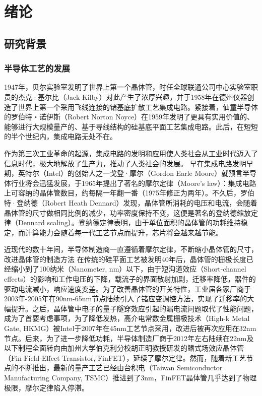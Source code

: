 \chapter{绪论}

\section{研究背景}

\subsection{半导体工艺的发展}

1947年，贝尔实验室发明了世界上第一个晶体管，时任全球联通公司中心实验室职员的杰克·基尔比（Jack Kilby）对此产生了浓厚兴趣，并于1958年在德州仪器创造了世界上第一个采用飞线连接的锗基底扩散工艺集成电路。紧接着，仙童半导体的罗伯特・诺伊斯（Robert Norton Noyce）在1959年发明了更具有实用价值的、能够进行大规模量产的、基于导线结构的硅基底平面工艺集成电路。此后，在短短的半个世纪内，集成电路无处不在。

作为第三次工业革命的起源，集成电路的发明和应用使人类社会从工业时代迈入了信息时代，极大地解放了生产力，推动了人类社会的发展。
早在集成电路发明早期，英特尔（Intel）的创始人之一戈登·摩尔（Gordon Earle Moore）就预言半导体行业将会迅猛发展，于1965年提出了著名的摩尔定律（Moore's law）\cite{moore_law_0}：集成电路上可容纳的晶体管数目，约每隔一年翻一番（1975年修正为两年\cite{moore_law_1}）。不久后，罗伯特·登纳德（Robert Heath Dennard）发现，晶体管所消耗的电压和电流，会随着晶体管的尺寸做相同比例的减少，功率密度保持不变，这便是著名的登纳德缩放定律（Dennard scaling）\cite{dennard_scaling}。登纳德定律表明，由于单位面积的晶体管的功耗维持稳定，而计算能力会随着每一代工艺节点而提升，芯片将会越来越节能。

近现代的数十年间，半导体制造商一直遵循着摩尔定律，不断缩小晶体管的尺寸，改进晶体管的制造方法%
在传统的硅平面工艺被发明40年后，晶体管的栅极长度已经缩小到了100纳米（Nanometer, nm）以下\cite{90nm_uniaxial_strained}，由于短沟道效应（Short-channel effects）的影响\cite{short-channel_effect}和工作电压的下降，载流子的界面散射加剧，迁移率降低，器件的驱动电流减小，响应速度变差。为了改善晶体管的开关特性，工业届各家厂商于2003年-2005年在90nm-65nm节点陆续引入了锗应变调控方法\cite{90nm_ge_strained,65nm_strained}，实现了迁移率的大幅提升。之后，晶体管中电子的量子隧穿效应引起的漏电流问题取代了性能问题，成为了首要考虑事项，为了降低发热，高介电常数金属栅极技术（High-k Metal Gate, HKMG）被Intel于2007年在45nm工艺节点采用\cite{45nm_hkmg}，改进后被再次应用在32nm节点\cite{32nm_hkmg_2nd}。后来，为了进一步降低功耗，半导体制造厂商于2012年左右陆续在22nm及以下制程全面转向由加州大学伯克利分校胡正明教授研发的鳍式场效应晶体管（Fin Field-Effect Transistor, FinFET）\cite{FinFET}，延续了摩尔定律。然而，随着新工艺节点的不断推出，最新的量产工艺已经由台积电（Taiwan Semiconductor Manufacturing Company, TSMC）推进到了3nm，FinFET晶体管几乎达到了物理极限，摩尔定律陷入停滞。

